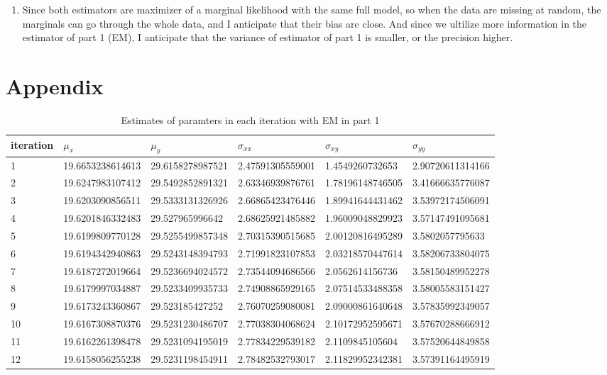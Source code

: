 \documentclass{article}
\begin{document}
\begin{enumerate}[font = \bfseries, leftmargin = 0 em]
		\item 
		Since both estimators are maximizer of a marginal likelihood with the same full model, so when the data are missing at random, the marginals can go through the whole data, and I anticipate that their bias are close. And since we ultilize more information in the estimator of part 1 (EM), I anticipate that the variance of estimator of part 1 is smaller, or the precision higher. 


\end{enumerate}


\newpage
\section*{Appendix}
{\scriptsize
\begin{longtable}{llllll}
\caption{Estimates of paramters in each iteration with EM in part 1}
\label{tab1}\\
\toprule
iteration & $\mu_x$ & $\mu_y$ & $\sigma_{xx}$ & $\sigma_{xy}$ & $\sigma_{yy}$\\
\midrule
1&19.6653238614613&29.6158278987521&2.47591305559001&1.4549260732653&2.90720611314166\\
2&19.6247983107412&29.5492852891321&2.63346939876761&1.78196148746505&3.41666635776087\\
3&19.6203090856511&29.5333131326926&2.66865423476446&1.89941644431462&3.53972174506091\\
4&19.6201846332483&29.527965996642&2.68625921485882&1.96009048829923&3.57147491095681\\
5&19.6199809770128&29.5255499857348&2.70315390515685&2.00120816495289&3.5802057795633\\
6&19.6194342940863&29.5243148394793&2.71991823107853&2.03218570447614&3.58206733804075\\
7&19.6187272019664&29.5236694024572&2.73544094686566&2.0562614156736&3.58150489952278\\
8&19.6179997034887&29.5233409935733&2.74908865929165&2.07514533488358&3.58005583151427\\
9&19.6173243360867&29.523185427252&2.76070259080081&2.09000861640648&3.57835992349057\\
10&19.6167308870376&29.5231230486707&2.77038304068624&2.10172952595671&3.57670288666912\\
11&19.6162261398478&29.5231094195019&2.77834229539182&2.1109845105604&3.57520644849858\\
12&19.6158056255238&29.5231198454911&2.78482532793017&2.11829952342381&3.57391164495919\\

\end{longtable}}
\end{document}
